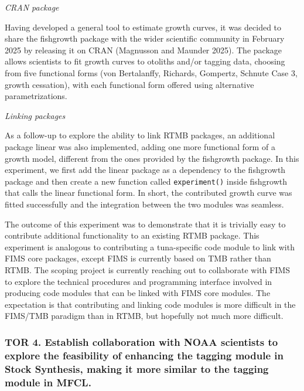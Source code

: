 \documentclass{SCreport}
\begin{document}
\vspace{1ex}

\textit{CRAN package}

\vspace{-1ex}

Having developed a general tool to estimate growth curves, it was decided to
share the \textsf{fishgrowth} package with the wider scientific community in
February 2025 by releasing it on CRAN (Magnusson and Maunder 2025). The package
allows scientists to fit growth curves to otoliths and/or tagging data, choosing
from five functional forms (von Bertalanffy, Richards, Gompertz, Schnute Case 3,
growth cessation), with each functional form offered using alternative
parametrizations.

\vspace{1ex}

\textit{Linking packages}

\vspace{-1ex}

As a follow-up to explore the ability to link RTMB packages, an additional
package \textsf{linear} was also implemented, adding one more functional form of
a growth model, different from the ones provided by the \textsf{fishgrowth}
package. In this experiment, we first add the \textsf{linear} package as a
dependency to the \textsf{fishgrowth} package and then create a new function
called \texttt{experiment()} inside \textsf{fishgrowth} that calls the
\textsf{linear} functional form. In short, the contributed growth curve was
fitted successfully and the integration between the two modules was seamless.

The outcome of this experiment was to demonstrate that it is trivially easy to
contribute additional functionality to an existing RTMB package. This experiment
is analogous to contributing a tuna-specific code module to link with FIMS core
packages, except FIMS is currently based on TMB rather than RTMB. The scoping
project is currently reaching out to collaborate with FIMS to explore the
technical procedures and programming interface involved in producing code
modules that can be linked with FIMS core modules. The expectation is that
contributing and linking code modules is more difficult in the FIMS/TMB paradigm
than in RTMB, but hopefully not much more difficult.

\vspace{1ex}

\subsubsection{TOR 4. Establish collaboration with NOAA scientists to explore
  the feasibility of enhancing the tagging module in Stock Synthesis, making it
  more similar to the tagging module in MFCL.}
\end{document}

